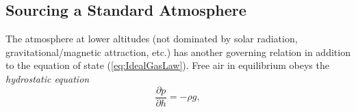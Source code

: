 \documentclass[11pt,dvipsnames]{thesis}
\begin{document}
\subsection{Sourcing a Standard Atmosphere}
The atmosphere at lower altitudes (not dominated by solar radiation, gravitational/magnetic attraction, etc.) has another governing relation in addition to the equation of state (\ref{eq:IdealGasLaw}). Free air in equilibrium obeys the \textit{hydrostatic equation}
\begin{equation}
\frac{\partial p}{\partial h} = -\rho g, \label{eq:HydrostaticEq}
\end{equation}
%
%
%
%
\end{document}
